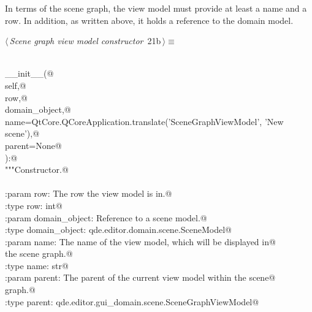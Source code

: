 \documentclass[
    a4paper,      %
    10pt,         %
    openright,    %
    notitlepage,  %
    parskip=half, %
]{scrreprt}       %
\theoremstyle{definition}                    %
\begin{document}
In terms of the scene graph, the view model must provide at least a name and a
row. In addition, as written above, it holds a reference to the domain model.

\begin{flushleft} \small
\begin{minipage}{\linewidth}\label{scrap15}\raggedright\small
{} $\langle\,${\itshape Scene graph view model constructor}\nobreak\ {\footnotesize {21b}}$\,\rangle\equiv$
\vspace{-1exm}
\begin{list}{}{} \item
\mbox{}\lstinline@@\\
\mbox{}\lstinline@def __init__(@\\
\mbox{}\lstinline@        self,@\\
\mbox{}\lstinline@        row,@\\
\mbox{}\lstinline@        domain_object,@\\
\mbox{}\lstinline@        name=QtCore.QCoreApplication.translate('SceneGraphViewModel', 'New scene'),@\\
\mbox{}\lstinline@        parent=None@\\
\mbox{}\lstinline@):@\\
\mbox{}\lstinline@    """Constructor.@\\
\mbox{}\lstinline@@\\
\mbox{}\lstinline@    :param row:           The row the view model is in.@\\
\mbox{}\lstinline@    :type  row:           int@\\
\mbox{}\lstinline@    :param domain_object: Reference to a scene model.@\\
\mbox{}\lstinline@    :type  domain_object: qde.editor.domain.scene.SceneModel@\\
\mbox{}\lstinline@    :param name:          The name of the view model, which will be displayed in@\\
\mbox{}\lstinline@                          the scene graph.@\\
\mbox{}\lstinline@    :type  name:          str@\\
\mbox{}\lstinline@    :param parent:        The parent of the current view model within the scene@\\
\mbox{}\lstinline@                          graph.@\\
\mbox{}\lstinline@    :type parent:         qde.editor.gui_domain.scene.SceneGraphViewModel@\\

\end{list}
\end{minipage}
\end{flushleft}
\end{document}
